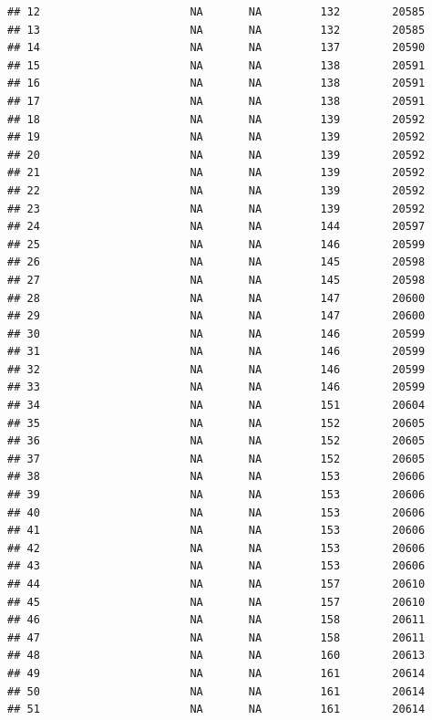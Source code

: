 \documentclass[
]{article}
\begin{document}
\begin{verbatim}
## 12                       NA       NA         132        20585
## 13                       NA       NA         132        20585
## 14                       NA       NA         137        20590
## 15                       NA       NA         138        20591
## 16                       NA       NA         138        20591
## 17                       NA       NA         138        20591
## 18                       NA       NA         139        20592
## 19                       NA       NA         139        20592
## 20                       NA       NA         139        20592
## 21                       NA       NA         139        20592
## 22                       NA       NA         139        20592
## 23                       NA       NA         139        20592
## 24                       NA       NA         144        20597
## 25                       NA       NA         146        20599
## 26                       NA       NA         145        20598
## 27                       NA       NA         145        20598
## 28                       NA       NA         147        20600
## 29                       NA       NA         147        20600
## 30                       NA       NA         146        20599
## 31                       NA       NA         146        20599
## 32                       NA       NA         146        20599
## 33                       NA       NA         146        20599
## 34                       NA       NA         151        20604
## 35                       NA       NA         152        20605
## 36                       NA       NA         152        20605
## 37                       NA       NA         152        20605
## 38                       NA       NA         153        20606
## 39                       NA       NA         153        20606
## 40                       NA       NA         153        20606
## 41                       NA       NA         153        20606
## 42                       NA       NA         153        20606
## 43                       NA       NA         153        20606
## 44                       NA       NA         157        20610
## 45                       NA       NA         157        20610
## 46                       NA       NA         158        20611
## 47                       NA       NA         158        20611
## 48                       NA       NA         160        20613
## 49                       NA       NA         161        20614
## 50                       NA       NA         161        20614
## 51                       NA       NA         161        20614

\end{verbatim}
\end{document}
